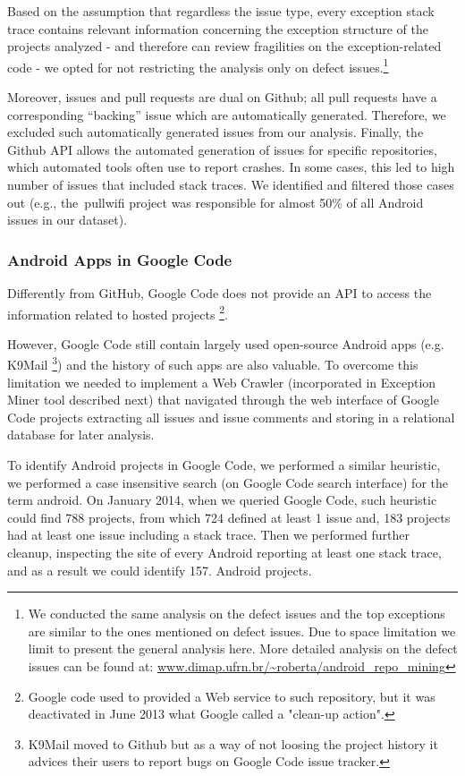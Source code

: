 \documentclass[conference]{IEEEtran}
\begin{document}
Based on the assumption that regardless the issue type, every exception stack
trace contains relevant information concerning the exception structure of the
projects analyzed - and therefore can review fragilities on the exception-related code -  
we opted for not restricting the analysis only on defect
issues.\footnote{We conducted the same analysis on the defect issues and the top
exceptions are similar to the ones mentioned on defect issues. Due to space
limitation we limit to present the general analysis here. More detailed analysis
on the defect issues can be found at:
\url{www.dimap.ufrn.br/~roberta/android_repo_mining}}

Moreover, issues and pull requests are dual on Github; all pull requests have a corresponding 
``backing'' issue which are automatically generated. Therefore, we excluded such automatically generated
issues from our analysis. Finally, the Github API allows the automated
generation of issues for specific repositories, which automated tools often use
to report crashes. In some cases, this led to high number of issues that
included stack traces. We identified and filtered those cases out (e.g.,
the~\textsf{pullwifi} project was responsible for almost 50\% of all Android issues in our dataset).

\subsubsection{Android Apps in Google Code}

Differently from GitHub, Google Code does not provide an API to access the information related
 to hosted projects \footnote{Google code used to provided a Web service to such repository, but it was deactivated in June 2013 what Google called a "clean-up action".}.

However, Google Code still contain largely used open-source Android apps (e.g. K9Mail \footnote{K9Mail moved to Github but as a way of not loosing the project history 
it advices their users to report bugs on Google Code issue tracker.})  and the history of such apps are also valuable. 
To overcome this limitation we needed to implement a Web Crawler (incorporated in Exception Miner tool described next) that navigated 
through the web interface of Google Code projects extracting all issues and issue comments and storing in a relational database for later analysis.

To identify Android projects in Google Code, we performed a similar heuristic, we performed a case insensitive search 
(on Google Code search interface) for the term \textsf{android}.  On January 2014, when we queried Google Code, such heuristic could
 find 788  projects, from which 724 defined at least 1 issue and, 183 projects 
had at least one issue including a stack trace. Then we performed further cleanup, inspecting the site of every Android
reporting at least one stack trace, and as a result we could identify 157. 
Android projects.  
\end{document}
